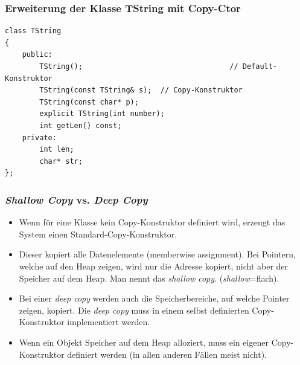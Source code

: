 \subsubsection{Erweiterung der Klasse TString mit Copy-Ctor}
\vspace{-\baselineskip}
\begin{minipage}{0.7\linewidth}
\begin{lstlisting}
class TString
{
	public:
		TString();									// Default-Konstruktor
		TString(const TString& s);	// Copy-Konstruktor
		TString(const char* p);
		explicit TString(int number);
		int getLen() const;
	private:
		int len;
		char* str;
};
\end{lstlisting}
\end{minipage}

\subsubsection{\emph{Shallow Copy} vs. \emph{Deep Copy}}
\begin{itemize}
	\item Wenn für eine Klasse kein Copy-Konstruktor definiert wird, erzeugt das System einen Standard-Copy-Konstruktor.
	\item Dieser kopiert alle Datenelemente (memberwise assignment). Bei Pointern, welche auf den Heap zeigen, wird nur die Adresse kopiert, nicht aber der Speicher auf dem Heap. Man nennt das \emph{shallow copy}. (\emph{shallow}=flach).
	\item Bei einer \emph{deep copy} werden auch die Speicherbereiche, auf welche Pointer zeigen, kopiert. Die \emph{deep copy} muss in einem selbst definierten Copy-Konstruktor implementiert werden.
	\item[\-]\begin{hinweis}
		Wenn ein Objekt Speicher auf dem Heap alloziert, muss ein eigener Copy-Konstruktor definiert werden (in allen anderen Fällen meist nicht).
	\end{hinweis}
\end{itemize}
